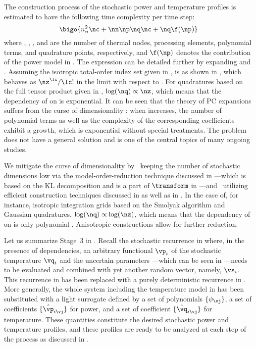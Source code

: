 The construction process of the stochastic power and temperature profiles is
estimated to have the following time complexity per time step:
\[
  \bigo{n_n^2 \nc + \nn \np \nq \nc + \nq \f(\np)}
\]
where \nn, \np, \nc, and \nq are the number of thermal nodes, processing
elements, polynomial terms, and quadrature points, respectively, and $\f(\np)$
denotes the contribution of the power model in . The
expression can be detailed further by expanding \nc and \nq. Assuming the
isotropic total-order index set given in , \nc
is as shown in , which behaves as
$\nz^\lc / \lc!$ in the limit with respect to \nz. For quadratures based on the
full tensor product given in , $\log(\nq) \propto \nz$,
which means that the dependency of \nq on \nz is exponential. It can be seen
that the theory of \ac{PC} expansions suffers from the curse of dimensionality
\cite{eldred2008, xiu2010}: when \nz increases, the number of polynomial terms
as well as the complexity of the corresponding coefficients exhibit a growth,
which is exponential without special treatments. The problem does not have a
general solution and is one of the central topics of many ongoing studies.

We mitigate the curse of dimensionality by \one~keeping the number of stochastic
dimensions low via the model-order-reduction technique discussed in
---which is based on the \ac{KL} decomposition
and is a part of $\transform$ in ---and
\two~utilizing efficient construction techniques discussed in
 as well as in . In the case
of, for instance, isotropic integration grids based on the Smolyak algorithm and
Gaussian quadratures, $\log(\nq) \propto \log(\nz)$, which means that the
dependency of \nq on \nz is only polynomial \cite{heiss2008}. Anisotropic
constructions allow for further reduction.

Let us summarize Stage~3 in . Recall the stochastic
recurrence in  where, in the presence of
dependencies, an arbitrary functional $\vp_i$ of the stochastic temperature
$\vq_i$ and the uncertain parameters \vu---which can be seen in
---needs to be evaluated and combined with yet another
random vector, namely, $\vs_i$. This recurrence in
 has been replaced with a purely deterministic
recurrence in . More generally, the whole system
including the temperature model in  has been
substituted with a light surrogate defined by a set of polynomials $\{
\psi_{\vj} \}$, a set of coefficients $\{ \hat{\vp}_{i \vj} \}$ for power, and a
set of coefficient $\{ \hat{\vq}_{i \vj} \}$ for temperature. These quantities
constitute the desired stochastic power and temperature profiles, and these
profiles are ready to be analyzed at each step of the process as discussed in
.

